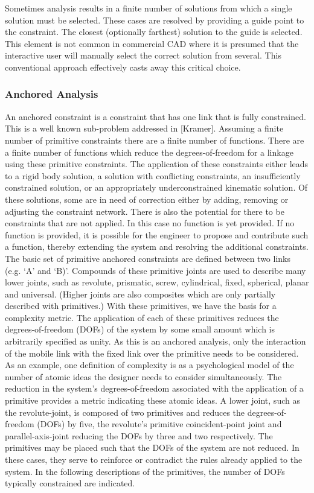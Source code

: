 \documentclass[]{report}
\begin{document}
Sometimes analysis results in a finite number of solutions 
from which a single solution must be selected. 
These cases are resolved by providing a guide point to the constraint. 
The closest (optionally farthest) solution to the guide is selected. 
This element is not common in commercial CAD where it is presumed that the interactive user will manually select the correct solution from several. 
This conventional approach effectively casts away this critical choice.

\subsubsection{Anchored Analysis}

An anchored constraint is a constraint that has one link that is fully constrained. 
This is a well known sub-problem addressed in [Kramer]. 
Assuming a finite number of primitive constraints there are a finite number of functions. 
There are a finite number of functions which reduce 
the degrees-of-freedom for a linkage using these primitive constraints. 
The application of these constraints either leads to a rigid body solution, 
a solution with conflicting constraints, an insufficiently constrained solution, 
or an appropriately underconstrained kinematic solution. 
Of these solutions, some are in need of correction either by adding, 
removing or adjusting the constraint network. 
There is also the potential for there to be constraints that are not applied. 
In this case no function is yet provided. 
If no function is provided, it is possible for the engineer to propose 
and contribute such a function, thereby extending the system and resolving the additional constraints.
The basic set of primitive anchored constraints are defined between two links (e.g. ‘A’ and ‘B)’. 
Compounds of these primitive joints are used to describe many lower joints, 
such as revolute, prismatic, screw, cylindrical, fixed, spherical, planar and universal. 
(Higher joints are also composites which are only partially described with primitives.) 
With these primitives, we have the basis for a complexity metric. 
The application of each of these primitives reduces the degrees-of-freedom (DOFs) 
of the system by some small amount which is arbitrarily specified as unity. 
As this is an anchored analysis, only the interaction of the mobile link 
with the fixed link over the primitive needs to be considered. 
As an example, one definition of complexity is as a psychological model 
of the number of atomic ideas the designer needs to consider simultaneously. 
The reduction in the system’s degrees-of-freedom associated with the application 
of a primitive provides a metric indicating these atomic ideas. 
A lower joint, such as the revolute-joint, is composed of two primitives 
and reduces the degrees-of-freedom (DOFs) by five, 
the revolute’s primitive coincident-point joint and 
parallel-axis-joint reducing the DOFs by three and two respectively.
The primitives may be placed such that the DOFs of the system are not reduced. 
In these cases, they serve to reinforce or contradict the rules 
already applied to the system. 
In the following descriptions of the primitives, 
the number of DOFs typically constrained are indicated.
\end{document}
